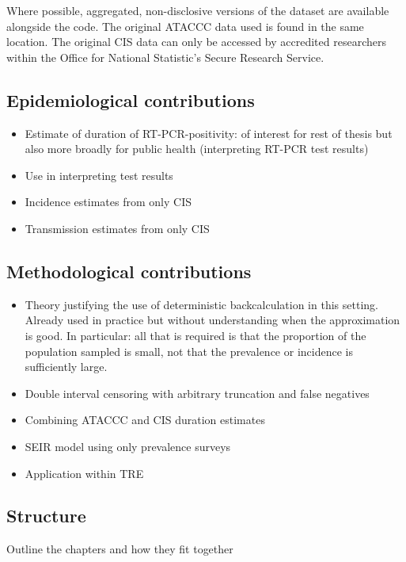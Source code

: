 \documentclass[thesis.tex]{subfiles}
\begin{document}
Where possible, aggregated, non-disclosive versions of the dataset are available alongside the code.
The original ATACCC data used is found in the same location.
The original CIS data can only be accessed by accredited researchers within the Office for National Statistic's Secure Research Service.

\subsection{Epidemiological contributions}

\begin{itemize}
    \item Estimate of duration of RT-PCR-positivity: of interest for rest of thesis but also more broadly for public health (\eg interpreting RT-PCR test results)
    \item Use in interpreting test results
    \item Incidence estimates from only CIS
    \item Transmission estimates from only CIS
\end{itemize}

\subsection{Methodological contributions}

\begin{itemize}
    \item Theory justifying the use of deterministic backcalculation in this setting. Already used in practice but without understanding when the approximation is good. In particular: all that is required is that the proportion of the population sampled is small, not that the prevalence or incidence is sufficiently large.
    \item Double interval censoring with arbitrary truncation and false negatives
    \item Combining ATACCC and CIS duration estimates
    \item SEIR model using only prevalence surveys
    \item Application within TRE
\end{itemize}

\subsection{Structure}

Outline the chapters and how they fit together
\end{document}
